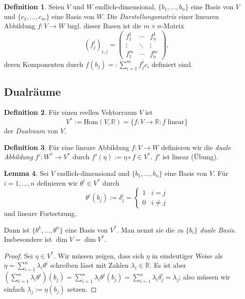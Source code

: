 \documentclass[a4paper]{scrreprt}
\numberwithin{equation}{chapter}
\newcommand{\R}{\mathbb{R}}
\theoremstyle{definition}
\newtheorem{defn}{Definition}[section]
\newtheorem{lemma}[defn]{Lemma}
\begin{document}
\begin{defn}
	Seien $V$ und $W$ endlich-dimensional, $\{b_1,\dots,b_n\}$ eine Basis von $V$ und $\{c_1,\dots,c_m\}$ eine Basis von $W$. Die \emph{Darstellungsmatrix} einer linearen Abbildung $f\colon V \to W$ bzgl. dieser Basen ist die $m\times n$-Matrix
	\[(f^i_j)_{i,j} = \begin{pmatrix}
		f^1_1 & \cdots & f^1_n\\
		\vdots & \ddots & \vdots\\
		f^m_1 & \cdots & f^m_n
	\end{pmatrix},\]
	deren Komponenten durch $f(b_j) =: \sum_{i=1}^m f^i_j c_i$ definiert sind.
\end{defn}

\subsection{Dualräume}

\begin{defn}
	Für einen reellen Vektorraum $V$ ist
	\[V^* := \mathrm{Hom}(V,\R) = \{f\colon V \to \R : f \; \text{linear}\}\]
	der \emph{Dualraum} von $V$.
\end{defn}

\begin{defn}
	Für eine lineare Abbildung $f\colon V \to W$ definieren wir die \emph{duale Abbildung} $f' \colon W^* \to V^*$ durch $f'(\eta) := \eta \circ f \in V^*$. $f'$ ist linear (Übung).
\end{defn}

\begin{lemma}
	Sei $V$ endlich-dimensional und $\{b_1,\dots,b_n\}$ eine Basis von $V$. Für $i = 1,\dots,n$ definieren wir $\theta^i \in V^*$ durch
	\[\theta^i(b_j) := \delta^i_j = \begin{cases} 1 & i = j \\ 0 & i \ne j\end{cases}\]
	und lineare Fortsetzung.

	Dann ist $\{\theta^1, \dots, \theta^n\}$ eine Basis von $V^*$. Man nennt sie die \emph{zu $\{b_i\}$ duale Basis}. Insbesondere ist $\dim V = \dim V^*$.

	\begin{proof}
		Sei $\eta \in V^*$. Wir müssen zeigen, dass sich $\eta$ in eindeutiger Weise als $\eta = \sum_{i=1}^n \lambda_i \theta^i$ schreiben lässt mit Zahlen $\lambda_i\in\R$. Es ist aber $\left(\sum_{i=1}^n \lambda_i \theta^i\right)(b_j) = \sum_{i=1}^n \lambda_i \theta^i(b_j) = \sum_{i=1}^n \lambda_i \delta^i_j = \lambda_j$; also müssen wir einfach $\lambda_j := \eta(b_j)$ setzen.
	\end{proof}
\end{lemma}
\end{document}
